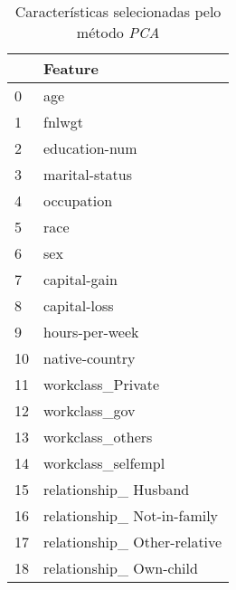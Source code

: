 \begin{table}
\centering
\caption{Características selecionadas pelo método \textit{PCA}}
\begin{tabular}{ll}
\toprule
{} &                       Feature \\
\midrule
0  &                           age \\
1  &                        fnlwgt \\
2  &                 education-num \\
3  &                marital-status \\
4  &                    occupation \\
5  &                          race \\
6  &                           sex \\
7  &                  capital-gain \\
8  &                  capital-loss \\
9  &                hours-per-week \\
10 &                native-country \\
11 &             workclass\_Private \\
12 &                 workclass\_gov \\
13 &              workclass\_others \\
14 &            workclass\_selfempl \\
15 &         relationship\_ Husband \\
16 &   relationship\_ Not-in-family \\
17 &  relationship\_ Other-relative \\
18 &       relationship\_ Own-child \\
\bottomrule
\end{tabular}
\end{table}
